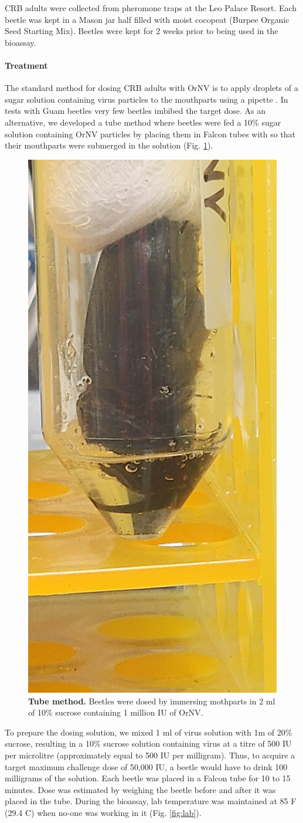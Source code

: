 \documentclass[12pt,letterpaper,english,bibliography=totocnumbered, abstract=on]{scrartcl}
\begin{document}
CRB adults were collected from pheromone traps at the Leo Palace Resort. Each beetle was kept in a Mason jar half filled with moist cocopeat (Burpee Organic Seed Starting Mix). Beetles were kept for 2 weeks prior to being used in the bioassay.

\paragraph{Treatment}

The standard method for dosing CRB adults with OrNV is to apply droplets of a sugar solution containing virus particles to the mouthparts using a pipette \cite{AgResearch2023-OrNV-prep2023,AgResearch2023-OrNV-minitest}. In tests with Guam beetles very few beetles imbibed the target dose. As an alternative, we developed a tube method \cite{tube-dosing-method} where beetles were fed a 10\% sugar solution containing OrNV particles by placing them in Falcon tubes with so that their mouthparts were submerged in the solution (Fig. \ref*{fig:tubemethod}).

\begin{figure}[H]
	\centering
	\caption{\textbf{Tube method.} Beetles were dosed by immersing mothparts in 2 ml of 10\% sucrose containing 1 million IU of OrNV.}
	\label{fig:tubemethod}
	\includegraphics[angle=-90,origin=c,width=0.15\linewidth]{images/tube_method}
\end{figure} 

To prepare the dosing solution, we mixed 1 ml of virus solution with 1m of 20\% sucrose, resulting in a 10\% sucrose solution containing virus at a titre of 500 IU per microlitre (approximately equal to 500 IU per milligram). Thus, to acquire a target maximum challenge dose of 50,000 IU, a beetle would have to drink 100 milligrams of the solution. Each beetle was placed in a Falcon tube for 10 to 15 minutes. Dose was estimated by weighing the beetle before and after it was placed in the tube. During the bioassay, lab temperature was maintained at 85 \degree F (29.4 \degree C) when no-one was working in it (Fig. \ref{fig:lab}). 
\end{document}
